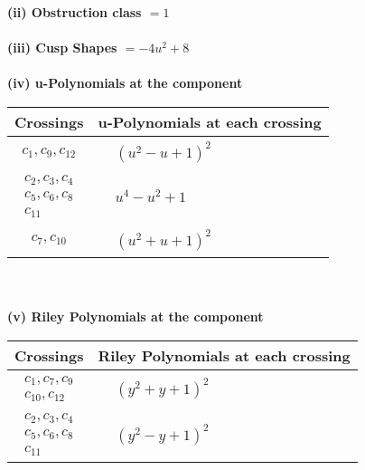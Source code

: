\documentclass[1p]{elsarticle_modified}
\theoremstyle{definition}
\begin{document}
\flushleft \textbf{(ii) Obstruction class $= 1$}\\~\\
\flushleft \textbf{(iii) Cusp Shapes $= -4 u^2+8$}\\~\\
\newpage\renewcommand{\arraystretch}{1}
\flushleft \textbf{(iv) u-Polynomials at the component}\newline \\
\begin{tabular}{m{50pt}|m{274pt}}
Crossings & \hspace{64pt}u-Polynomials at each crossing \\
\hline $$\begin{aligned}c_{1},c_{9},c_{12}\end{aligned}$$&$\begin{aligned}
&(u^2- u+1)^2
\end{aligned}$\\
\hline $$\begin{aligned}c_{2},c_{3},c_{4}\\c_{5},c_{6},c_{8}\\c_{11}\end{aligned}$$&$\begin{aligned}
&u^4- u^2+1
\end{aligned}$\\
\hline $$\begin{aligned}c_{7},c_{10}\end{aligned}$$&$\begin{aligned}
&(u^2+u+1)^2
\end{aligned}$\\
\hline
\end{tabular}\\~\\
\newpage\renewcommand{\arraystretch}{1}
\flushleft \textbf{(v) Riley Polynomials at the component}\newline \\
\begin{tabular}{m{50pt}|m{274pt}}
Crossings & \hspace{64pt}Riley Polynomials at each crossing \\
\hline $$\begin{aligned}c_{1},c_{7},c_{9}\\c_{10},c_{12}\end{aligned}$$&$\begin{aligned}
&(y^2+y+1)^2
\end{aligned}$\\
\hline $$\begin{aligned}c_{2},c_{3},c_{4}\\c_{5},c_{6},c_{8}\\c_{11}\end{aligned}$$&$\begin{aligned}
&(y^2- y+1)^2
\end{aligned}$\\
\hline
\end{tabular}\\~\\
\end{document}
